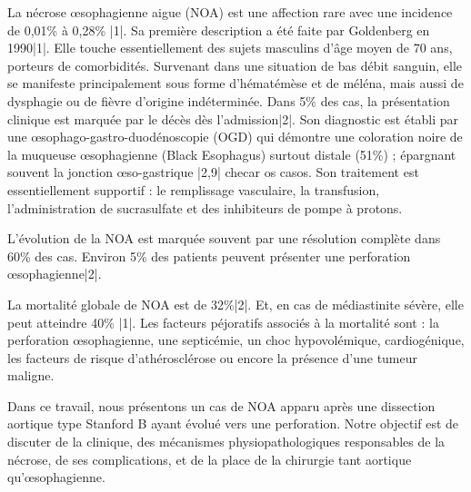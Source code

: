 \documentclass[./tfe.tex]{subfiles}
\begin{document}
La nécrose œsophagienne aigue (NOA) est une affection rare avec une incidence de 0,01\% à 0,28\% |1|. Sa première description a été faite par Goldenberg en 1990|1|. Elle touche essentiellement des sujets masculins d’âge moyen de 70 ans, porteurs de comorbidités. Survenant dans une situation de bas débit sanguin, elle se manifeste principalement sous forme d'hématémèse et de méléna, mais aussi de dysphagie ou de fièvre d'origine indéterminée. Dans 5\% des cas, la présentation clinique est marquée par le décès dès l’admission|2|. Son diagnostic est établi par une œsophago-gastro-duodénoscopie (OGD) qui démontre une coloration noire de la muqueuse œsophagienne (Black Esophagus) surtout distale (51\%) ; épargnant souvent la jonction œso-gastrique |2,9| checar os casos. Son traitement est essentiellement supportif : le remplissage vasculaire, la transfusion, l’administration de sucrasulfate et des inhibiteurs de pompe à protons.

L’évolution de la NOA est marquée souvent par une résolution complète dans 60\% des cas. Environ 5\% des patients peuvent présenter une perforation œsophagienne|2|.

La mortalité globale de NOA est de 32\%|2|. Et, en cas de médiastinite sévère, elle peut atteindre 40\% |1|. Les facteurs péjoratifs associés à la mortalité sont : la perforation œsophagienne, une septicémie, un choc hypovolémique, cardiogénique, les facteurs de risque d’athérosclérose ou encore la présence d’une tumeur maligne.

Dans ce travail, nous présentons un cas de NOA apparu après une dissection aortique type Stanford B ayant évolué vers une perforation. Notre objectif est de discuter de la clinique, des mécanismes physiopathologiques responsables de la nécrose, de ses complications, et de la place de la chirurgie tant aortique qu’œsophagienne.
\end{document}
